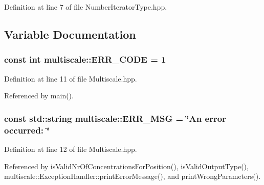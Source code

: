 \-Definition at line 7 of file \-Number\-Iterator\-Type.\-hpp.



\subsection{\-Variable \-Documentation}
\hypertarget{namespacemultiscale_a4ee40795105048ee371efeeb7962ecf6}{
\subsubsection[{\-E\-R\-R\-\_\-\-C\-O\-D\-E}]{\setlength{\rightskip}{0pt plus 5cm}const int {\bf multiscale\-::\-E\-R\-R\-\_\-\-C\-O\-D\-E} = 1}}\label{namespacemultiscale_a4ee40795105048ee371efeeb7962ecf6}


\-Definition at line 11 of file \-Multiscale.\-hpp.



\-Referenced by main().

\hypertarget{namespacemultiscale_a06490e4e11ef359aa0260f96579ce584}{
\subsubsection[{\-E\-R\-R\-\_\-\-M\-S\-G}]{\setlength{\rightskip}{0pt plus 5cm}const std\-::string {\bf multiscale\-::\-E\-R\-R\-\_\-\-M\-S\-G} = \char`\"{}\-An error occurred\-: \char`\"{}}}\label{namespacemultiscale_a06490e4e11ef359aa0260f96579ce584}


\-Definition at line 12 of file \-Multiscale.\-hpp.



\-Referenced by is\-Valid\-Nr\-Of\-Concentrations\-For\-Position(), is\-Valid\-Output\-Type(), multiscale\-::\-Exception\-Handler\-::print\-Error\-Message(), and print\-Wrong\-Parameters().

